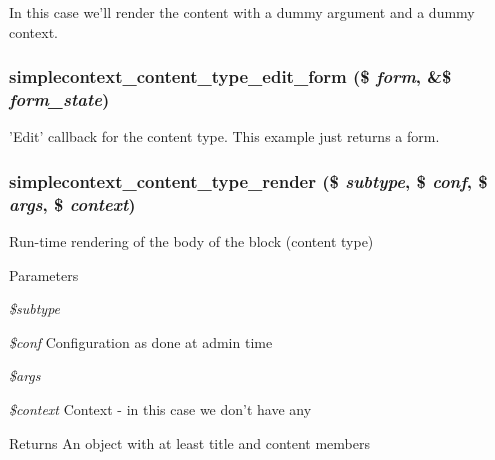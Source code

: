 In this case we'll render the content with a dummy argument and a dummy context. \hypertarget{simplecontext__content__type_8inc_a036c8d9da11c23c4e11a6cfc3d5d08bd}{
\subsubsection[{simplecontext\_\-content\_\-type\_\-edit\_\-form}]{\setlength{\rightskip}{0pt plus 5cm}simplecontext\_\-content\_\-type\_\-edit\_\-form (\$ {\em form}, \/  \&\$ {\em form\_\-state})}}
\label{simplecontext__content__type_8inc_a036c8d9da11c23c4e11a6cfc3d5d08bd}
'Edit' callback for the content type. This example just returns a form. \hypertarget{simplecontext__content__type_8inc_a03ef3985a9df1ae74dab1e918d48199b}{
\subsubsection[{simplecontext\_\-content\_\-type\_\-render}]{\setlength{\rightskip}{0pt plus 5cm}simplecontext\_\-content\_\-type\_\-render (\$ {\em subtype}, \/  \$ {\em conf}, \/  \$ {\em args}, \/  \$ {\em context})}}
\label{simplecontext__content__type_8inc_a03ef3985a9df1ae74dab1e918d48199b}
Run-\/time rendering of the body of the block (content type)


\begin{DoxyParams}{Parameters}
\item[{\em \$subtype}]\item[{\em \$conf}]Configuration as done at admin time \item[{\em \$args}]\item[{\em \$context}]Context -\/ in this case we don't have any\end{DoxyParams}
\begin{DoxyReturn}{Returns}
An object with at least title and content members 
\end{DoxyReturn}


